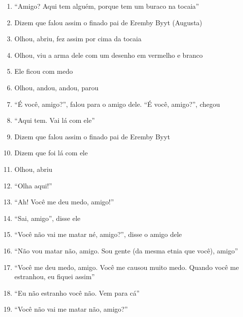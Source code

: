 \begin{enumerate}
 \item ``Amigo? Aqui tem alguém, porque tem um buraco na tocaia''

 \item Dizem que falou assim o finado pai de Eremby Byyt (Augusta)

 \item Olhou, abriu, fez assim por cima da tocaia

 \item Olhou, viu a arma dele com um desenho em vermelho e branco

 \item Ele ficou com medo

 \begin{center}\end{center}

 \item Olhou, andou, andou, parou

 \item ``É você, amigo?'', falou para o amigo dele. ``É você, amigo?'', chegou

 \item ``Aqui tem.  Vai lá com ele''

 \item Dizem que falou assim o finado pai de Eremby Byyt

 \item Dizem que foi lá com ele

 \item Olhou, abriu

 \item ``Olha aqui!''

 \item ``Ah! Você me deu medo, amigo!''

 \item ``Sai, amigo'', disse ele

 \item ``Você não vai me matar né, amigo?'', disse o amigo dele

 \item ``Não vou matar não, amigo. Sou gente (da mesma etnia que você), amigo''

 \item ``Você me deu medo, amigo. Você me causou muito medo. Quando você me
 estranhou, eu fiquei assim''

 \item ``Eu não estranho você não. Vem para cá''

 \item ``Você não vai me matar não, amigo?''


\end{enumerate}
